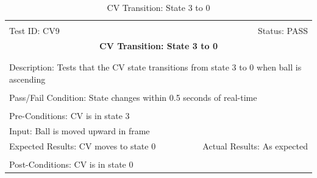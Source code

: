 \documentclass[11pt]{article}
\begin{document}
\begin{center}
\begin{table}[H]
\begin{tabular}{|l r|}\hline&\\[-2mm]
	Test ID: CV9	&Status: PASS\\[-3mm]
	\multicolumn{2}{|c|}{\textbf{\large{CV Transition: State 3 to 0}}}\\&\\\hline&\\[-3mm]
	\multicolumn{2}{|p{\textwidth}|}{Description: Tests that the CV state transitions from state 3 to 0 when ball is ascending}\\[1mm]\hline&\\[-3mm]
	\multicolumn{2}{|p{\textwidth}|}{Pass/Fail Condition: State changes within 0.5 seconds of real-time}\\[1mm]\hline&\\[-3mm]
	\multicolumn{2}{|p{\textwidth}|}{Pre-Conditions: CV is in state 3}\\[4mm]
	\multicolumn{2}{|p{\textwidth}|}{Input: Ball is moved upward in frame}\\[2mm]\hline
	\multicolumn{1}{|p{0.49\textwidth}}{Expected Results: CV moves to state 0}	&\multicolumn{1}{|p{0.45\textwidth}|}{Actual Results: As expected}\\\hline&\\[-3mm]
	\multicolumn{2}{|p{\textwidth}|}{Post-Conditions: CV is in state 0}\\\hline
\end{tabular}
\caption{CV Transition: State 3 to 0}
\end{table}
\end{center}
\end{document}
